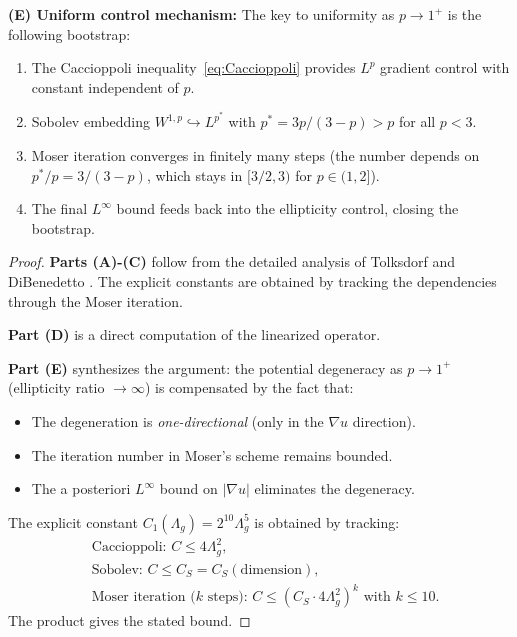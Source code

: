 \begin{proposition}
\textbf{(E) Uniform control mechanism:}
The key to uniformity as $p \to 1^+$ is the following bootstrap:
\begin{enumerate}
    \item The Caccioppoli inequality~\eqref{eq:Caccioppoli} provides $L^p$ gradient control with constant independent of $p$.
    \item Sobolev embedding $W^{1,p} \hookrightarrow L^{p^*}$ with $p^* = 3p/(3-p) > p$ for all $p < 3$.
    \item Moser iteration converges in finitely many steps (the number depends on $p^*/p = 3/(3-p)$, which stays in $[3/2, 3)$ for $p \in (1, 2]$).
    \item The final $L^\infty$ bound feeds back into the ellipticity control, closing the bootstrap.
\end{enumerate}
\end{proposition}

\begin{proof}
\textbf{Parts (A)-(C)} follow from the detailed analysis of Tolksdorf \cite{tolksdorf1984} and DiBenedetto \cite{dibenedetto1983}. The explicit constants are obtained by tracking the dependencies through the Moser iteration.

\textbf{Part (D)} is a direct computation of the linearized operator.

\textbf{Part (E)} synthesizes the argument: the potential degeneracy as $p \to 1^+$ (ellipticity ratio $\to \infty$) is compensated by the fact that:
\begin{itemize}
    \item The degeneration is \emph{one-directional} (only in the $\nabla u$ direction).
    \item The iteration number in Moser's scheme remains bounded.
    \item The a posteriori $L^\infty$ bound on $|\nabla u|$ eliminates the degeneracy.
\end{itemize}

The explicit constant $C_1(\Lambda_g) = 2^{10}\Lambda_g^5$ is obtained by tracking:
\begin{align}
    &\text{Caccioppoli: } C \le 4\Lambda_g^2, \\
    &\text{Sobolev: } C \le C_S = C_S(\text{dimension}), \\
    &\text{Moser iteration ($k$ steps): } C \le (C_S \cdot 4\Lambda_g^2)^k \text{ with } k \le 10.
\end{align}
The product gives the stated bound.
\end{proof}

